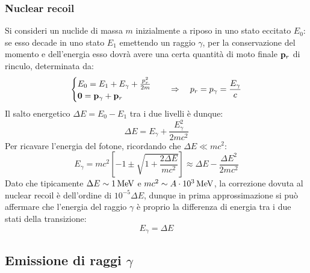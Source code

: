\subsubsection{Nuclear recoil}

Si consideri un nuclide di massa $ m $ inizialmente a riposo in uno stato eccitato $ E_0 $: se esso decade in uno stato $ E_1 $ emettendo un raggio $ \gamma $, per la conservazione del momento e dell'energia esso dovrà avere una certa quantità di moto finale $ \mathbf{p}_r $ di rinculo, determinata da:
\begin{equation*}
	\begin{cases}
		E_0 = E_1 + E_{\gamma} + \frac{p_r^2}{2m} \\
		\mathbf{0} = \mathbf{p}_{\gamma} + \mathbf{p}_r
	\end{cases}
	\quad\Rightarrow\quad p_r = p_{\gamma} = \frac{E_{\gamma}}{c}
\end{equation*}
Il salto energetico $ \Delta E = E_0 - E_1 $ tra i due livelli è dunque:
\begin{equation}
	\Delta E = E_{\gamma} + \frac{E_{\gamma}^2}{2mc^2}
	\label{eq:2.38}
\end{equation}
Per ricavare l'energia del fotone, ricordando che $ \Delta E \ll mc^2 $:
\begin{equation}
	E_{\gamma} = mc^2 \left[ -1 \pm \sqrt{1 + \frac{2\Delta E}{mc^2}} \right] \approx \Delta E - \frac{\Delta E^2}{2mc^2}
	\label{eq:2.39}
\end{equation}
Dato che tipicamente $ \Delta E \sim 1\,\mathrm{MeV} $ e $ mc^2 \sim A \cdot 10^3 \,\mathrm{MeV} $, la correzione dovuta al nuclear recoil è dell'ordine di $ 10^{-5} \Delta E $, dunque in prima approssimazione si può affermare che l'energia del raggio $ \gamma $ è proprio la differenza di energia tra i due stati della transizione:
\begin{equation}
	E_{\gamma} = \Delta E
	\label{eq:2.40}
\end{equation}

\subsection{Emissione di raggi \texorpdfstring{$ \gamma $}{TEXT}}


